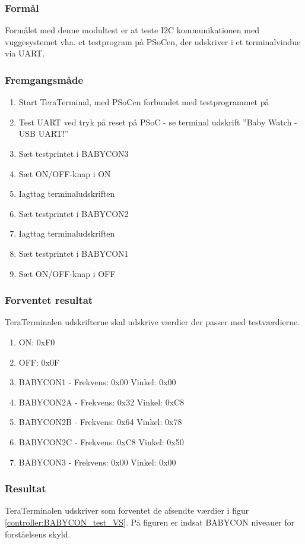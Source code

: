 \subsubsection*{Formål}
Formålet med denne modultest er at teste I2C kommunikationen med vuggesystemet vha. et testprogram på PSoCen, der udskriver i et terminalvindue via UART.

\subsubsection*{Fremgangsmåde}
\begin{enumerate}
\item Start TeraTerminal, med PSoCen forbundet med testprogrammet på
\item Test UART ved tryk på reset på PSoC - se terminal udskrift ''Baby Watch - USB UART!''
\item Sæt testprintet i BABYCON3
\item Sæt ON/OFF-knap i ON
\item Iagttag terminaludskriften
\item Sæt testprintet i BABYCON2 
\item Iagttag terminaludskriften
\item Sæt testprintet i BABYCON1
\item Sæt ON/OFF-knap i OFF
\end{enumerate}

\subsubsection*{Forventet resultat} 
TeraTerminalen udskrifterne skal udskrive værdier der passer med testværdierne.
\begin{enumerate}
\item ON:  0xF0
\item OFF: 0x0F
\item BABYCON1 -  Frekvens: 0x00 Vinkel: 0x00
\item BABYCON2A - Frekvens: 0x32 Vinkel: 0xC8
\item BABYCON2B - Frekvens: 0x64 Vinkel: 0x78
\item BABYCON2C - Frekvens: 0xC8 Vinkel: 0x50
\item BABYCON3 -  Frekvens: 0x00 Vinkel: 0x00
\end{enumerate}

\subsubsection*{Resultat} 
TeraTerminalen udskriver som forventet de afsendte værdier i figur \ref{controller:BABYCON_test_VS}. På figuren er indsat BABYCON niveauer for forståelsens skyld.

